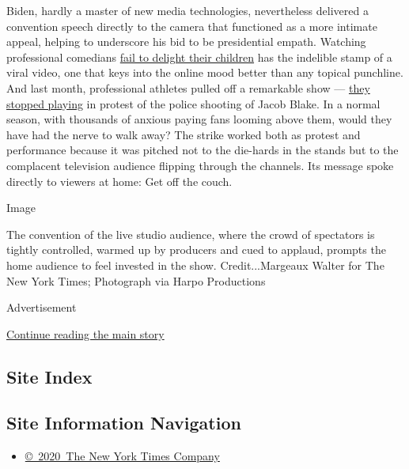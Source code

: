 Biden, hardly a master of new media technologies, nevertheless delivered
a convention speech directly to the camera that functioned as a more
intimate appeal, helping to underscore his bid to be presidential
empath. Watching professional comedians
\href{https://mashable.com/video/jimmy-fallon-home-monologue-heckled-daughters/}{fail
to delight their children} has the indelible stamp of a viral video, one
that keys into the online mood better than any topical punchline. And
last month, professional athletes pulled off a remarkable show ---
\href{https://www.nytimes3xbfgragh.onion/2020/08/27/sports/basketball/kenosha-nba-protests-players-boycott.html}{they
stopped playing} in protest of the police shooting of Jacob Blake. In a
normal season, with thousands of anxious paying fans looming above them,
would they have had the nerve to walk away? The strike worked both as
protest and performance because it was pitched not to the die-hards in
the stands but to the complacent television audience flipping through
the channels. Its message spoke directly to viewers at home: Get off the
couch.

Image

The convention of the live studio audience, where the crowd of
spectators is tightly controlled, warmed up by producers and cued to
applaud, prompts the home audience to feel invested in the show.
Credit...Margeaux Walter for The New York Times; Photograph via Harpo
Productions

Advertisement

\protect\hyperlink{after-bottom}{Continue reading the main story}

\hypertarget{site-index}{%
\subsection{Site Index}\label{site-index}}

\hypertarget{site-information-navigation}{%
\subsection{Site Information
Navigation}\label{site-information-navigation}}

\begin{itemize}
\tightlist
\item
  \href{https://help.nytimes3xbfgragh.onion/hc/en-us/articles/115014792127-Copyright-notice}{©~2020~The
  New York Times Company}
\end{itemize}

